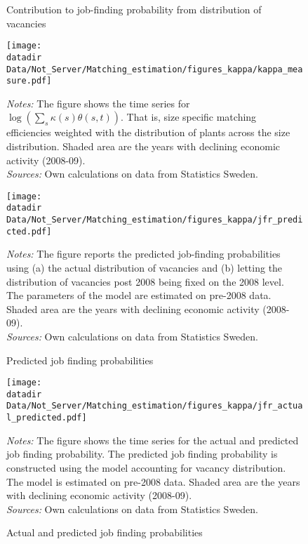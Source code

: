 \begin{figure}[t]
\centering
\caption{Contribution to job-finding probability from distribution of vacancies}
\label{fig:agg_imp:omegatimeseries}
\texttt{[image: \\datadir Data/Not\_Server/Matching\_estimation/figures\_kappa/kappa\_measure.pdf]}
\begin{flushleft}
\footnotesize{\emph{Notes:} The figure shows the time series for $\log \left( \sum_s \kappa(s) \theta(s, t)  \right)$. That is, size specific matching efficiencies weighted with the distribution of plants across the size distribution. Shaded area are the years with declining economic activity (2008-09).} \\ 
\footnotesize{\emph{Sources:} Own calculations on data from Statistics Sweden.} 
\end{flushleft}
\vspace{0mm}
\centering
\caption{Predicted job finding probabilities}
\label{fig:agg_imp:pred_jfp}
\texttt{[image: \\datadir Data/Not\_Server/Matching\_estimation/figures\_kappa/jfr\_predicted.pdf]}
\begin{flushleft}
\footnotesize{\emph{Notes:} The figure reports the predicted job-finding probabilities using (a) the actual distribution of vacancies and (b) letting the distribution of vacancies post 2008 being fixed on the 2008 level. The parameters of the model are estimated on pre-2008 data. Shaded area are the years with declining economic activity (2008-09).} \\ 
\footnotesize{\emph{Sources:} Own calculations on data from Statistics Sweden.}
\end{flushleft}
\end{figure}

\begin{figure}[t]
\centering
\caption{Actual and predicted job finding probabilities}
\texttt{[image: \\datadir Data/Not\_Server/Matching\_estimation/figures\_kappa/jfr\_actual\_predicted.pdf]}
\begin{flushleft}
\footnotesize{\emph{Notes:} The figure shows the time series for the actual and predicted job finding probability. The predicted job finding probability is constructed using the model accounting for vacancy distribution. The model is estimated on pre-2008 data. Shaded area are the years with declining economic activity (2008-09).} \\ 
\footnotesize{\emph{Sources:} Own calculations on data from Statistics Sweden.} 
\label{fig:actual_and_predicted_jfp_model_with_distribution}
\end{flushleft}
\end{figure}